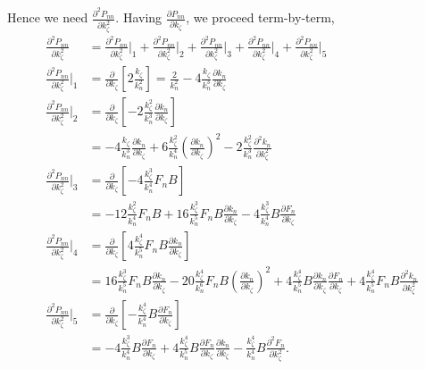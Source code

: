 \documentclass{article}
\begin{document}
Hence we need $\frac{\partial^2 P_{nn}}{\partial k_{\zeta}^2}$. Having $\frac{\partial P_{nn}}{\partial k_{\zeta}}$, we proceed term-by-term,
\begin{align}
\frac{\partial^2 P_{nn}}{\partial k_{\zeta}^2} &= \frac{\partial^2 P_{nn}}{\partial k_{\zeta}^2}\bigg|_{1} + \frac{\partial^2 P_{nn}}{\partial k_{\zeta}^2}\bigg|_{2} + \frac{\partial^2 P_{nn}}{\partial k_{\zeta}^2}\bigg|_{3} + \frac{\partial^2 P_{nn}}{\partial k_{\zeta}^2}\bigg|_{4} + \frac{\partial^2 P_{nn}}{\partial k_{\zeta}^2}\bigg|_{5} \\
\frac{\partial^2 P_{nn}}{\partial k_{\zeta}^2}\bigg|_{1} &= \frac{\partial}{\partial k_{\zeta}} \left[2 \frac{k_{\zeta}}{k_{n}^2} \right] = \frac{2}{k_{n}^2} - 4 \frac{k_{\zeta}}{k_{n}^3} \frac{\partial k_{n}}{\partial k_{\zeta}} \\
\frac{\partial^2 P_{nn}}{\partial k_{\zeta}^2}\bigg|_{2} &= \frac{\partial}{\partial k_{\zeta}} \left[-2 \frac{k_{\zeta}^2}{k_{n}^3} \frac{\partial k_{n}}{\partial k_{\zeta}} \right] \\
&= - 4 \frac{k_{\zeta}}{k_{n}^3} \frac{\partial k_{n}}{\partial k_{\zeta}} + 6 \frac{k_{\zeta}^2}{k_{n}^4} \left(\frac{\partial k_{n}}{\partial k_{\zeta}} \right)^2 - 2 \frac{k_{\zeta}^2}{k_{n}^3} \frac{\partial^2 k_{n}}{\partial k_{\zeta}^2} \\
\frac{\partial^2 P_{nn}}{\partial k_{\zeta}^2}\bigg|_{3} &= \frac{\partial}{\partial k_{\zeta}} \left[-4 \frac{k_{\zeta}^3}{k_{n}^4} F_{n} B \right] \\
&= -12 \frac{k_{\zeta}^2}{k_{n}^4} F_{n} B + 16 \frac{k_{\zeta}^3}{k_{n}^5} F_{n} B \frac{\partial k_{n}}{\partial k_{\zeta}} - 4 \frac{k_{\zeta}^3}{k_{n}^4} B \frac{\partial F_{n}}{\partial k_{\zeta}} \\
\frac{\partial^2 P_{nn}}{\partial k_{\zeta}^2}\bigg|_{4} &= \frac{\partial}{\partial k_{\zeta}} \left[ 4 \frac{k_{\zeta}^4}{k_{n}^5} F_{n} B \frac{\partial k_{n}}{\partial k_{\zeta}} \right] \\
&= 16 \frac{k_{\zeta}^3}{k_{n}^5} F_{n} B \frac{\partial k_{n}}{\partial k_{\zeta}} - 20 \frac{k_{\zeta}^4}{k_{n}^6} F_{n} B \left( \frac{\partial k_{n}}{\partial k_{\zeta}} \right)^2 + 4 \frac{k_{\zeta}^4}{k_{n}^5} B \frac{\partial k_{n}}{\partial k_{\zeta}} \frac{\partial F_{n}}{\partial k_{\zeta}} + 4 \frac{k_{\zeta}^4}{k_{n}^5} F_{n} B \frac{\partial^2 k_{n}}{\partial k_{\zeta}^2} \\
\frac{\partial^2 P_{nn}}{\partial k_{\zeta}^2}\bigg|_{5} &= \frac{\partial}{\partial k_{\zeta}} \left[ - \frac{k_{\zeta}^4}{k_{n}^4} B \frac{\partial F_{n}}{\partial k_{\zeta}} \right] \\
&= -4 \frac{k_{\zeta}^3}{k_{n}^4} B \frac{\partial F_{n}}{\partial k_{\zeta}} + 4 \frac{k_{\zeta}^4}{k_{n}^5} B \frac{\partial F_{n}}{\partial k_{\zeta}} \frac{\partial k_{n}}{\partial k_{\zeta}} - \frac{k_{\zeta}^4}{k_{n}^4} B \frac{\partial^2 F_{n}}{\partial k_{\zeta}^2}.
\end{align}
\end{document}
